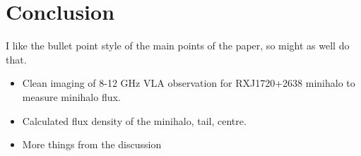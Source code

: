 \documentclass{pas}
\begin{document}
\section{Conclusion}
I like the bullet point style of the main points of the paper, so might as well do that.
\begin{itemize}
  \item Clean imaging of 8-12 GHz VLA observation for RXJ1720+2638 minihalo to measure minihalo flux.
  \item Calculated flux density of the minihalo, tail, centre.
  \item More things from the discussion
\end{itemize}


\end{document}
